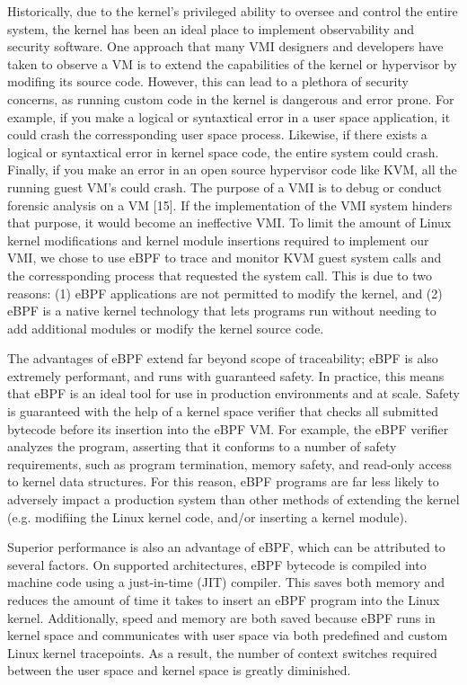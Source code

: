 \documentclass{report}
\begin{document}
\begin{spacing}{1.5}
{\large
Historically, due to the kernel’s privileged ability to oversee and control the entire system, the kernel has been an ideal place to implement observability and security software. One approach that many VMI designers and developers have taken to observe a VM is to extend the capabilities of the kernel or hypervisor by modifing its source code. However, this can lead to a plethora of security concerns, as running custom code in the kernel is dangerous and error prone. For example, if you make a logical or syntaxtical error in a user space application, it could crash the corressponding user space process. Likewise, if there exists a logical or syntaxtical error in kernel space code, the entire system could crash. Finally, if you make an error in an open source hypervisor code like KVM, all the running guest VM's could crash. The purpose of a VMI is to debug or conduct forensic analysis on a VM [15]. If the implementation of the VMI system hinders that purpose, it would become an ineffective VMI. To limit the amount of Linux kernel modifications and kernel module insertions required to implement our VMI, we chose to use eBPF to trace and monitor KVM guest system calls and the corressponding process that requested the system call. This is due to two reasons: (1) eBPF applications are not permitted to modify the kernel, and (2) eBPF is a native kernel technology that lets programs run without needing to add additional modules or modify the kernel source code.
\newline
}

{\large
The advantages of eBPF extend far beyond scope of traceability; eBPF is also extremely performant, and runs with guaranteed safety. In practice, this means that eBPF is an ideal tool for use in production environments and at scale. Safety is guaranteed with the help of a kernel space verifier that checks all submitted bytecode before its insertion into the eBPF VM. For example, the eBPF verifier analyzes the program, asserting that it conforms to a number of safety requirements, such as program termination, memory safety, and read-only access to kernel data structures. For this reason, eBPF programs are far less likely to adversely impact a production system than other methods of extending the kernel (e.g. modifiing the Linux kernel code, and/or inserting a kernel module).
\newline
}

{\large
Superior performance is also an advantage of eBPF, which can be attributed to several factors. On supported architectures, eBPF bytecode is compiled into machine code using a just-in-time (JIT) compiler. This saves both memory and reduces the amount of time it takes to insert an eBPF program into the Linux kernel. Additionally, speed and memory are both saved because eBPF runs in kernel space and communicates with user space via both predefined and custom Linux kernel tracepoints. As a result, the number of context switches required between the user space and kernel space is greatly diminished.
\newline
}


\end{spacing}
\end{document}
